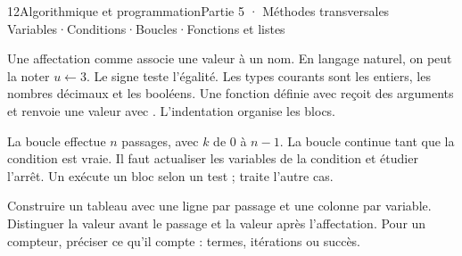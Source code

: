 \begin{ouverture}[listes]{12}{Algorithmique et programmation}{Partie 5 · Méthodes transversales}
{Variables\enspace·\enspace Conditions\enspace·\enspace Boucles\enspace·\enspace Fonctions et listes}
\end{ouverture}
\essentiel
{}
\begin{definition}
Une affectation comme  associe une valeur à un nom. En langage
naturel, on peut la noter $u\leftarrow3$. Le signe \code{==} teste l'égalité.
Les types courants sont les entiers, les nombres décimaux et les booléens.
Une fonction définie avec  reçoit des arguments et renvoie une
valeur avec . L'indentation organise les blocs.
\end{definition}
\begin{propriete}
La boucle  effectue $n$ passages, avec $k$ de 0 à $n-1$.
La boucle  continue tant que la condition est vraie.
Il faut actualiser les variables de la condition et étudier l'arrêt.
Un  exécute un bloc selon un test ;  traite l'autre cas.
\end{propriete}
\begin{savoirfaire}
Construire un tableau avec une ligne par passage et une colonne par variable.
Distinguer la valeur avant le passage et la valeur après l'affectation.
Pour un compteur, préciser ce qu'il compte : termes, itérations ou succès.
\end{savoirfaire}
\begin{center}
\par{}
\end{center}

